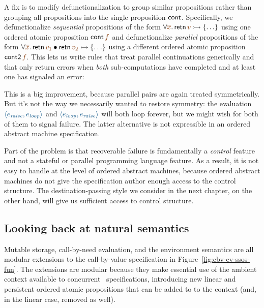A fix is to modify defunctionalization to group similar propositions
rather than grouping all propositions into the single
proposition ${\sf cont}$. Specifically, we defunctionalize {\it
  sequential} propositions of the form $\forall
\lf{\overline{x}}.\,{\sf retn}\,\lf{v} \lefti \{\ldots \}$ using one
ordered atomic proposition ${\sf cont}\,\lf{f}$ and defunctionalize
{\it parallel} propositions of the form $\forall
\lf{\overline{x}}.\,{\sf retn}\,\lf{v_1} \fuse {\sf retn}\,\lf{v_2}
\lefti \{\ldots \}$ using a different ordered atomic proposition ${\sf
  cont2}\,\lf{f}$. This lets us write rules that treat parallel
continuations generically and that only return errors when {\it both}
sub-computations have completed and at least one has signaled an
error:


\noindent
This is a big improvement, because parallel pairs are again treated
symmetrically. But it's not the way we necessarily wanted to restore
symmetry: the evaluation $\obj{\langle e_{\it raise}, e_{\it loop} \rangle}$
and $\obj{\langle e_{\it loop}, e_{\it raise} \rangle}$ will both loop
forever, but we might wish for both of them to signal failure. The
latter alternative is not expressible in an ordered abstract machine
specification.

Part of the problem is that recoverable failure is fundamentally a
{\it control} feature and not a stateful or parallel programming
language feature. As a result, it is not easy to handle at the level
of ordered abstract machines, because ordered abstract machines do not
give the specification author enough access to the control
structure. The destination-passing style we consider in the next
chapter, on the other hand, 
will give us sufficient access to control structure.


\subsection{Looking back at natural semantics}
\label{sec:enriching-natsem}

Mutable storage, call-by-need evaluation, and the environment
semantics are all modular extensions to the call-by-value specification in
Figure~\ref{fig:cbv-ev-ssos-fun}.  The
extensions are modular because they make essential use of the ambient
context available to concurrent \sls~specifications, introducing new
linear and persistent ordered atomic propositions that can be added to
to the context (and, in the linear case, removed as well).

